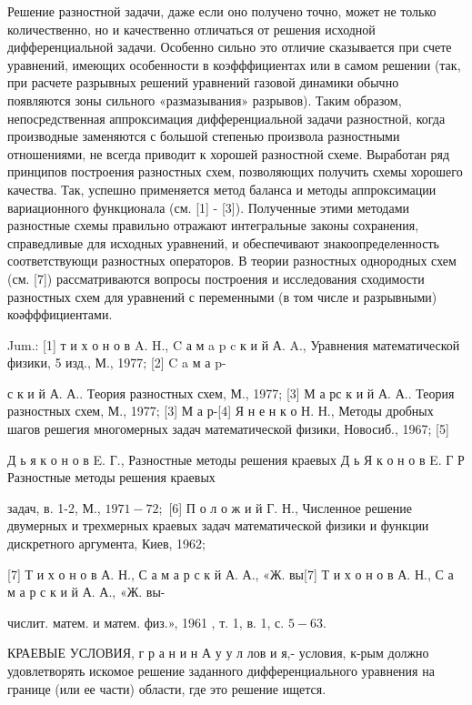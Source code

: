 \documentclass[10pt]{article}
\begin{document}
Решение разностной задачи, даже если оно получено точно, может не только количественно, но и качественно отличаться от решения исходной дифференциальной задачи. Особенно сильно это отличие сказывается при счете уравнений, имеющих особенности в коэфффициентах или в самом решении (так, при расчете разрывных решений уравнений газовой динамики обычно появляются зоны сильного «размазывания» разрывов). Таким образом, непосредственная аппроксимация дифференциальной задачи разностной, когда производные заменяются с большой степенью произвола разностными отношениями, не всегда приводит к хорошей разностной схеме. Выработан ряд принципов построения разностных схем, позволяющих получить схемы хорошего качества. Так, успешно применяется метод баланса и методы аппроксимации вариационного функционала (см. [1] - [3]). Полученные этими методами разностные схемы правильно отражают интегральные законы сохранения, справедливые для исходных уравнений, и обеспечивают знакоопределенность соответствующи разностных операторов. В теории разностных однородных схем (см. [7]) рассматриваются вопросы построения и исследования сходимости разностных схем для уравнений с переменными (в том числе и разрывными) коәфффициентами.



Jum.: [1] т и х о н о в A. H., C а м a p c к и й А. A., Уравнения математической физики, 5 изд., М., 1977; [2] C a м а p-

с к и й А. А.. Теория разностных схем, М., 1977; [3] М а рс к и й А. А.. Теория разностных схем, М., 1977; [3] М а р-[4] Я н е н к о Н. Н., Методы дробных шагов решегия многомерных задач математической физики, Новосиб., 1967; [5]

Д ь я к о н о в E. Г., Разностные методы решения краевых Д ь Я к о н о в E. Г Р Разностные методы решения краевых

задач, в. 1-2, М., $1971-72 ;$ [6] П о л о ж и й Г. Н., Численное решение двумерных и трехмерных краевых задач математической физики и функции дискретного аргумента, Киев, 1962;

[7] Т и х о н о в А. Н., С а м а р с к й А. А., «Ж. вы[7] Т и х о н о в А. Н., С а м а р с к и й А. А., «Ж. вы-

числит. матем. и матем. физ.», 1961 , т. 1, в. 1, с. $5-63$.



КРАЕВЫЕ УСЛОВИЯ, $г$ р а н и н А у у л лов и я,- условия, к-рым должно удовлетворять искомое решение заданного дифференциального уравнения на границе (или ее части) области, где это решение ищется.
\end{document}
